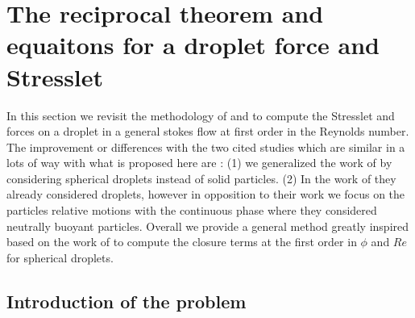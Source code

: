 \section{The reciprocal theorem and equaitons for a droplet force and Stresslet}
\label{ap:reciprocal}


In this section we revisit the methodology of \citet{stone2001inertial} and \citet{raja2010inertial}  to compute the Stresslet and forces on a droplet in a general stokes flow at first order in the Reynolds number. 
The improvement or differences with the two cited studies which are similar in a lots of way with what is proposed here are : 
(1) we generalized the work of \citet{stone2001inertial} by considering spherical droplets instead of solid particles. 
(2) In the work of \citet{raja2010inertial} they already considered droplets, however in opposition to their work we focus on the particles relative motions with the continuous phase where they considered neutrally buoyant particles. 
Overall we provide a general method greatly inspired based on the work of \citet{stone2001inertial} to compute the closure terms at the first order in $\phi$ and $Re$ for spherical droplets. 


\subsection{Introduction of the problem}


